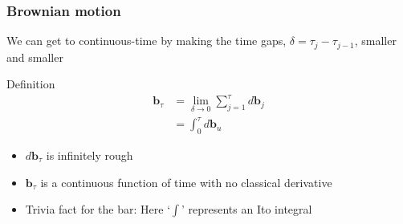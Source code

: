 \documentclass[36pt,handout]{beamer}
\newcommand{\ft}[1]{\frametitle{#1}}
\newcommand{\bb}{\mathbf{b}}
\begin{document}

\begin{frame}
\ft{Brownian motion}
We can get to continuous-time by making the time gaps, $\delta = \tau_j-\tau_{j-1}$, smaller and smaller

\begin{block}{Definition}
$$
\begin{aligned}
\bb_\tau &= \lim_{\delta \to 0} \sum_{j=1}^\tau d\bb_j \\
&= \int_0^\tau d\bb_u
\end{aligned}
$$
\end{block}

\begin{itemize}
\item $d\bb_\tau$ is infinitely rough
\item $\bb_\tau$ is a continuous function of time with no classical derivative 
\item Trivia fact for the bar: Here `$\int$' represents an Ito integral

\end{itemize}

\end{frame}


{
\begin{frame}[t]
\end{frame}
}

\end{document}
